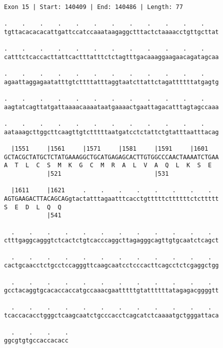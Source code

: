 \documentclass{article}
\begin{document}
\newpage
\begin{Verbatim}
Exon 15 | Start: 140409 | End: 140486 | Length: 77
 
.    .    .    .    .    .    .    .    .    .    .    .    
tgttacacacacattgattccatccaaataagaggctttactctaaaacctgttgcttat
  
.    .    .    .    .    .    .    .    .    .    .    .    
catttctcaccacttattcactttatttctctagtttgacaaaggaagaacagatagcaa
  
.    .    .    .    .    .    .    .    .    .    .    .    
agaattaggagaatatttgtcttttatttaggtaatcttattctagattttttatgagtg
  
.    .    .    .    .    .    .    .    .    .    .    .    
aagtatcagttatgattaaaacaaaataatgaaaactgaattagacatttagtagccaaa
  
.    .    .    .    .    .    .    .    .    .    .    .    
aataaagcttggcttcaagttgtctttttaatgatcctctattctgtatttaatttacag
  
  |1551     |1561     |1571     |1581     |1591     |1601   
GCTACGCTATGCTCTATGAAAGGCTGCATGAGAGCACTTGTGGCCCAACTAAAATCTGAA
A  T  L  C  S  M  K  G  C  M  R  A  L  V  A  Q  L  K  S  E  
            |521                          |531              
  
  |1611     |1621     .    .    .    .    .    .    .    .  
AGTGAAGACTTACAGCAGgtactatttagaatttcacctgtttttcttttttctcttttt
S  E  D  L  Q  Q                                            
            |541                                            
  
  .    .    .    .    .    .    .    .    .    .    .    .  
ctttgaggcagggtctcactctgtcacccaggcttagagggcagttgtgcaatctcagct
  
  .    .    .    .    .    .    .    .    .    .    .    .  
cactgcaacctctgcctccagggttcaagcaatcctcccacttcagcctctcgaggctgg
  
  .    .    .    .    .    .    .    .    .    .    .    .  
gcctacaggtgcacaccaccatgccaaacgaatttttgtattttttatagagacggggtt
  
  .    .    .    .    .    .    .    .    .    .    .    .  
tcaccacacctgggctcaagcaatctgcccacctcagcatctcaaaatgctgggattaca
  
  .    .    .    .
ggcgtgtgccaccacacc
\end{Verbatim}
\newpage
\end{document}
